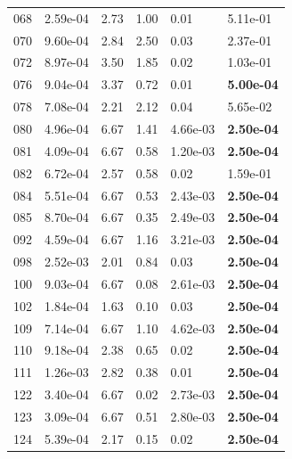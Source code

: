 \begin{figure}[htbp!]
{\begin{minipage}[t]{0.48\linewidth}
\begin{tabular}{llllll}
                    068 & 2.59e-04 & 2.73 & 1.00 & 0.01 & 5.11e-01\\
                    070 & 9.60e-04 & 2.84 & 2.50 & 0.03 & 2.37e-01\\
                    072 & 8.97e-04 & 3.50 & 1.85 & 0.02 & 1.03e-01\\
                    076 & 9.04e-04 & 3.37 & 0.72 & 0.01 & \textbf{5.00e-04}\\
                    078 & 7.08e-04 & 2.21 & 2.12 & 0.04 & 5.65e-02\\
                    080 & 4.96e-04 & 6.67 & 1.41 & 4.66e-03 & \textbf{2.50e-04}\\
                    081 & 4.09e-04 & 6.67 & 0.58 & 1.20e-03 & \textbf{2.50e-04}\\
                    082 & 6.72e-04 & 2.57 & 0.58 & 0.02 & 1.59e-01\\
                    084 & 5.51e-04 & 6.67 & 0.53 & 2.43e-03 & \textbf{2.50e-04}\\
                    085 & 8.70e-04 & 6.67 & 0.35 & 2.49e-03 & \textbf{2.50e-04}\\
                    092 & 4.59e-04 & 6.67 & 1.16 & 3.21e-03 & \textbf{2.50e-04}\\
                    098 & 2.52e-03 & 2.01 & 0.84 & 0.03 & \textbf{2.50e-04}\\
                    100 & 9.03e-04 & 6.67 & 0.08 & 2.61e-03 & \textbf{2.50e-04}\\
                    102 & 1.84e-04 & 1.63 & 0.10 & 0.03 & \textbf{2.50e-04}\\
                    109 & 7.14e-04 & 6.67 & 1.10 & 4.62e-03 & \textbf{2.50e-04}\\
                    110 & 9.18e-04 & 2.38 & 0.65 & 0.02 & \textbf{2.50e-04}\\
                    111 & 1.26e-03 & 2.82 & 0.38 & 0.01 & \textbf{2.50e-04}\\
                    122 & 3.40e-04 & 6.67 & 0.02 & 2.73e-03 & \textbf{2.50e-04}\\
                    123 & 3.09e-04 & 6.67 & 0.51 & 2.80e-03 & \textbf{2.50e-04}\\
                    124 & 5.39e-04 & 2.17 & 0.15 & 0.02 & \textbf{2.50e-04}\\
        \bottomrule
        \end{tabular}
    \end{minipage}
    \hspace{0.02\linewidth}
    \begin{minipage}[t]{0.48\linewidth}

\end{minipage}}
\end{figure}
